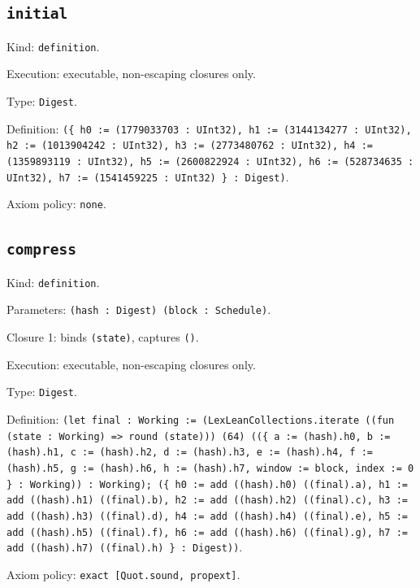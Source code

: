 \documentclass[11pt]{article}
\begin{document}
\subsection*{\texttt{initial}}
\noindent Kind: \texttt{definition}.\par
\noindent Execution: executable, non-escaping closures only.\par
\noindent Type: \texttt{Digest}.\par
\noindent Definition: \texttt{(\{ h0 := (1779033703 : UInt32), h1 := (3144134277 : UInt32), h2 := (1013904242 : UInt32), h3 := (2773480762 : UInt32), h4 := (1359893119 : UInt32), h5 := (2600822924 : UInt32), h6 := (528734635 : UInt32), h7 := (1541459225 : UInt32) \} : Digest)}.\par
\noindent Axiom policy: \texttt{none}.\par
\subsection*{\texttt{compress}}
\noindent Kind: \texttt{definition}.\par
\noindent Parameters: \texttt{(hash : Digest) (block : Schedule)}.\par
\noindent Closure 1: binds \texttt{(state)}, captures \texttt{()}.\par
\noindent Execution: executable, non-escaping closures only.\par
\noindent Type: \texttt{Digest}.\par
\noindent Definition: \texttt{(let final : Working := (LexLeanCollections.iterate ((fun (state : Working) => round (state))) (64) ((\{ a := (hash).h0, b := (hash).h1, c := (hash).h2, d := (hash).h3, e := (hash).h4, f := (hash).h5, g := (hash).h6, h := (hash).h7, window := block, index := 0 \} : Working)) : Working); (\{ h0 := add ((hash).h0) ((final).a), h1 := add ((hash).h1) ((final).b), h2 := add ((hash).h2) ((final).c), h3 := add ((hash).h3) ((final).d), h4 := add ((hash).h4) ((final).e), h5 := add ((hash).h5) ((final).f), h6 := add ((hash).h6) ((final).g), h7 := add ((hash).h7) ((final).h) \} : Digest))}.\par
\noindent Axiom policy: \texttt{exact [Quot.sound, propext]}.\par
\end{document}
